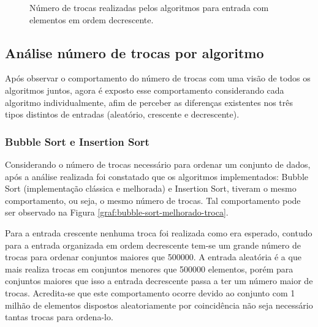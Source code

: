 \documentclass[conference,onecolumn]{IEEEtran}
\begin{document}
\begin{figure}[H]
\begin{center}
\end{center}
\caption{Número de trocas realizadas pelos algoritmos para entrada com elementos em ordem decrescente.}
\label{graf:trocas-decrescente-menos}
\end{figure}

\subsection{Análise número de trocas por algoritmo}

Após observar o comportamento do número de trocas com uma visão de todos os algoritmos juntos, agora é exposto esse comportamento considerando cada algoritmo individualmente, afim de perceber as diferenças existentes nos três tipos distintos de entradas (aleatório, crescente e decrescente).

\subsubsection{Bubble Sort e Insertion Sort}

Considerando o número de trocas necessário para ordenar um conjunto de dados, após a análise realizada foi constatado que os algoritmos implementados: Bubble Sort (implementação clássica e melhorada) e Insertion Sort, tiveram o mesmo comportamento, ou seja, o mesmo número de trocas. Tal comportamento pode ser observado na Figura \ref{graf:bubble-sort-melhorado-troca}.

Para a entrada crescente nenhuma troca foi realizada como era esperado, contudo para a entrada organizada em ordem decrescente tem-se um grande número de trocas para ordenar conjuntos maiores que 500000. A entrada aleatória é a que mais realiza trocas em conjuntos menores que 500000 elementos, porém para conjuntos maiores que isso a entrada decrescente passa a ter um número maior de trocas. Acredita-se que este comportamento ocorre devido ao conjunto com 1 milhão de elementos dispostos aleatoriamente por coincidência não seja necessário tantas trocas para ordena-lo.
\end{document}
